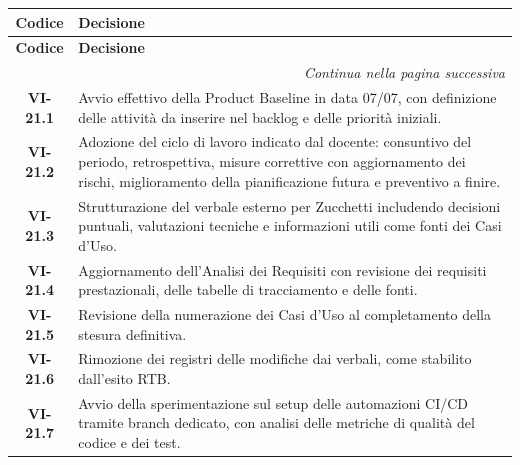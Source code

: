 \renewcommand{\arraystretch}{1.3}
\vspace{-0.3cm}
\noindent
\begin{longtable}{c p{12cm}}
    \toprule
    \textbf{Codice} & \textbf{Decisione} \\
    \midrule
    \endfirsthead

    \toprule
    \textbf{Codice} & \textbf{Decisione} \\
    \midrule
    \endhead

    \midrule
    \multicolumn{2}{r}{\textit{Continua nella pagina successiva}} \\
    \midrule
    \endfoot

    \bottomrule
    \endlastfoot

    

    \textbf{VI-21.1} & Avvio effettivo della Product Baseline in data 07/07, con definizione delle attività da inserire nel backlog e delle priorità iniziali. \\

    \textbf{VI-21.2} & Adozione del ciclo di lavoro indicato dal docente: consuntivo del periodo, retrospettiva, misure correttive con aggiornamento dei rischi, miglioramento della pianificazione futura e preventivo a finire. \\

    \textbf{VI-21.3} & Strutturazione del verbale esterno per Zucchetti includendo decisioni puntuali, valutazioni tecniche e informazioni utili come fonti dei Casi d’Uso. \\

    \textbf{VI-21.4} & Aggiornamento dell’Analisi dei Requisiti con revisione dei requisiti prestazionali, delle tabelle di tracciamento e delle fonti. \\

    \textbf{VI-21.5} & Revisione della numerazione dei Casi d’Uso al completamento della stesura definitiva. \\

    \textbf{VI-21.6} & Rimozione dei registri delle modifiche dai verbali, come stabilito dall’esito RTB. \\

    \textbf{VI-21.7} & Avvio della sperimentazione sul setup delle automazioni CI/CD tramite branch dedicato, con analisi delle metriche di qualità del codice e dei test. \\

\end{longtable}

